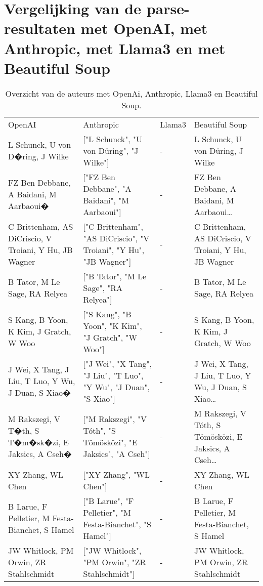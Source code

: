 \section{Vergelijking van de parse-resultaten met OpenAI, met Anthropic, met Llama3 en met Beautiful Soup}
\begin{table}[h!]
    \tiny
    \caption{Overzicht van de auteurs met OpenAi, Anthropic, Llama3 en Beautiful Soup.}
    \centering
    \begin{sideways}
        \begin{tabularx}{\linewidth}{|X|X|p{1cm}|X|} 
            \hline
            \rowcolor{lightgray}
            \multicolumn{4}{|X|}{Auteurs}\\ 
            \hline
            \rowcolor{lightgray}
            OpenAI & Anthropic & Llama3 & Beautiful Soup\\ 
            \hline
            L Schunck, U von D�ring, J Wilke & ["L Schunck", "U von Düring", "J Wilke"] & - & L Schunck, U von Düring, J Wilke\\ 
            FZ Ben Debbane, A Baidani, M Aarbaoui� & ["FZ Ben Debbane", "A Baidani", "M Aarbaoui"] & - & FZ Ben Debbane, A Baidani, M Aarbaoui…\\
            C Brittenham, AS DiCriscio, V Troiani, Y Hu, JB Wagner & ["C Brittenham", "AS DiCriscio", "V Troiani", "Y Hu", "JB Wagner"] & - & C Brittenham, AS DiCriscio, V Troiani, Y Hu, JB Wagner\\
            B Tator, M Le Sage, RA Relyea & ["B Tator", "M Le Sage", "RA Relyea"] & - & B Tator, M Le Sage, RA Relyea\\
            S Kang, B Yoon, K Kim, J Gratch, W Woo & ["S Kang", "B Yoon", "K Kim", "J Gratch", "W Woo"] & - & S Kang, B Yoon, K Kim, J Gratch, W Woo\\
            J Wei, X Tang, J Liu, T Luo, Y Wu, J Duan, S Xiao� & ["J Wei", "X Tang", "J Liu", "T Luo", "Y Wu", "J Duan", "S Xiao"] & - & J Wei, X Tang, J Liu, T Luo, Y Wu, J Duan, S Xiao…\\
            M Rakszegi, V T�th, S T�m�sk�zi, E Jaksics, A Cseh� & ["M Rakszegi", "V Tóth", "S Tömösközi", "E Jaksics", "A Cseh"] & - & M Rakszegi, V Tóth, S Tömösközi, E Jaksics, A Cseh…\\
            XY Zhang, WL Chen & ["XY Zhang", "WL Chen"] & - & XY Zhang, WL Chen\\
            B Larue, F Pelletier, M Festa-Bianchet, S Hamel & ["B Larue", "F Pelletier", "M Festa-Bianchet", "S Hamel"] & - & B Larue, F Pelletier, M Festa-Bianchet, S Hamel\\
            JW Whitlock, PM Orwin, ZR Stahlschmidt & ["JW Whitlock", "PM Orwin", "ZR Stahlschmidt"] & - & JW Whitlock, PM Orwin, ZR Stahlschmidt\\
            \hline
        \end{tabularx}
    \end{sideways}
    \label{table:llmAuteur}
\end{table}

